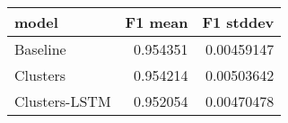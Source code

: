 \begin{tabular}{lrr}
\toprule
 model         &   F1 mean &   F1 stddev \\
\midrule
 Baseline      &  0.954351 &  0.00459147 \\
 Clusters      &  0.954214 &  0.00503642 \\
 Clusters-LSTM &  0.952054 &  0.00470478 \\
\bottomrule
\end{tabular}